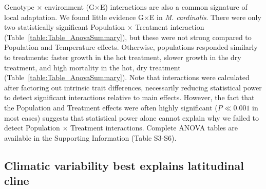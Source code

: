 \documentclass[11pt, oneside]{article}
\begin{document}
Genotype $\times$ environment (G$\times$E) interactions are also a common signature of local adaptation. We found little evidence G$\times$E in \textit{M. cardinalis}. There were only two statistically significant Population $\times$ Treatment interaction (Table~\ref{table:Table_AnovaSummary}), but these were not strong compared to Population and Temperature effects. Otherwise, populations responded similarly to treatments: faster growth in the hot treatment, slower growth in the dry treatment, and high mortality in the hot, dry treatment (Table~\ref{table:Table_AnovaSummary}). Note that interactions were calculated after factoring out intrinsic trait differences, necessarily reducing statistical power to detect significant interactions relative to main effects. However, the fact that the Population and Treatment effects were often highly significant ($P \ll 0.001$ in most cases) suggests that statistical power alone cannot explain why we failed to detect Population $\times$ Treatment interactions. Complete ANOVA tables are available in the Supporting Information (Table S3-S6).

\subsection*{Climatic variability best explains latitudinal cline}
\end{document}
